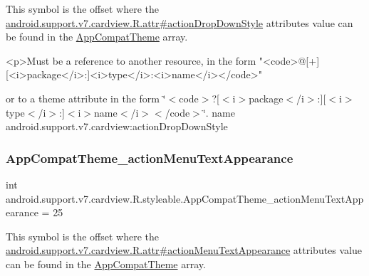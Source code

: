 This symbol is the offset where the \hyperlink{classandroid_1_1support_1_1v7_1_1cardview_1_1R_1_1attr_a969d499ccb6506d8b945d61bc9df3d55}{android.\+support.\+v7.\+cardview.\+R.\+attr\#action\+Drop\+Down\+Style} attribute\textquotesingle{}s value can be found in the \hyperlink{classandroid_1_1support_1_1v7_1_1cardview_1_1R_1_1styleable_a52e6f69f954ecc2622d72c0b4d298938}{App\+Compat\+Theme} array.

\begin{DoxyVerb}      <p>Must be a reference to another resource, in the form "<code>@[+][<i>package</i>:]<i>type</i>:<i>name</i></code>"
\end{DoxyVerb}
 or to a theme attribute in the form \char`\"{}$<$code$>$?\mbox{[}$<$i$>$package$<$/i$>$\+:\mbox{]}\mbox{[}$<$i$>$type$<$/i$>$\+:\mbox{]}$<$i$>$name$<$/i$>$$<$/code$>$\char`\"{}.  name android.\+support.\+v7.\+cardview\+:action\+Drop\+Down\+Style \mbox{\label{classandroid_1_1support_1_1v7_1_1cardview_1_1R_1_1styleable_af99c77056c4366c7634c36bb75ea3709}} 
\subsubsection{\texorpdfstring{App\+Compat\+Theme\+\_\+action\+Menu\+Text\+Appearance}{AppCompatTheme\_actionMenuTextAppearance}}
{\footnotesize\ttfamily int android.\+support.\+v7.\+cardview.\+R.\+styleable.\+App\+Compat\+Theme\+\_\+action\+Menu\+Text\+Appearance = 25\hspace{0.3cm}{\ttfamily [static]}}

This symbol is the offset where the \hyperlink{classandroid_1_1support_1_1v7_1_1cardview_1_1R_1_1attr_a7783040bfbf3c10e09ddbe6af9e98989}{android.\+support.\+v7.\+cardview.\+R.\+attr\#action\+Menu\+Text\+Appearance} attribute\textquotesingle{}s value can be found in the \hyperlink{classandroid_1_1support_1_1v7_1_1cardview_1_1R_1_1styleable_a52e6f69f954ecc2622d72c0b4d298938}{App\+Compat\+Theme} array.


